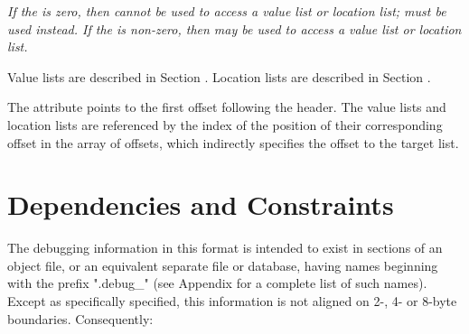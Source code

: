 \textit{If the \HFNoffsetentrycount{} is zero, then \DWFORMloclistx{} cannot 
be used to access a 
\bb
value list or 
\eb
location list; \DWFORMsecoffset{} must be used 
instead. If the \HFNoffsetentrycount{} is non-zero, then \DWFORMloclistx{} 
may be used to access a 
\bb
value list or location 
\eb
list.
\db
}

\bb
Value lists are described in Section .
\eb
Location lists are described in Section .
\db

The \DWATloclistsbase{} attribute points to the first offset 
following the header. The 
\bb
value lists and
\eb
location lists are referenced
by the index of the position of their corresponding offset in the
array of offsets, which indirectly specifies the offset to the
target list.

\section{Dependencies and Constraints}
\label{datarep:dependenciesandconstraints}
The debugging information in this format is intended to
exist in sections of an object file, or an equivalent
separate file or database, having names beginning with
the prefix ".debug\_" (see Appendix 
for a complete list of such names). 
Except as specifically specified, this information is not 
aligned on 2-, 4- or 8-byte boundaries. Consequently:

